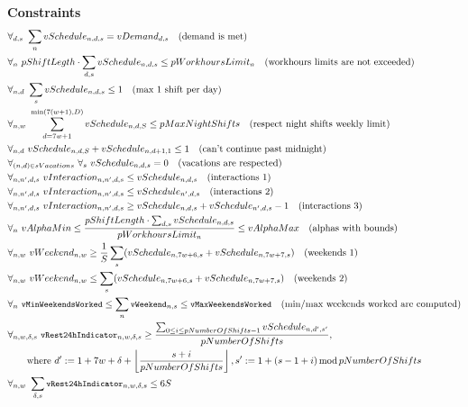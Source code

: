 \documentclass{article}
\newcommand{\varWeekendWorkedIndicator}[2]{\texttt{\small vWeekend}_{#1, #2}}
\newcommand{\varMinWeekendsWorked}{\texttt{\small vMinWeekendsWorked}}
\newcommand{\varMaxWeekendsWorked}{\texttt{\small vMaxWeekendsWorked}}
\newcommand{\varDayLengthBreakIndicator}[4]{\texttt{\small vRest24hIndicator}_{#1, #2, #3, #4}}
\begin{document}
\textbf{Constraints}
\begin{align*}
&\forall_{d,s}\ \sum_n vSchedule_{n,d,s} = vDemand_{d, s}\quad \text{(demand is met)} \\
&\forall_{n}\ pShiftLegth\cdot\sum_{d, s} vSchedule_{n,d,s} \leq pWorkhoursLimit_n \quad \text{(workhours limits are not exceeded)} \\
&\forall_{n,d}\ \sum_s vSchedule_{n,d,s} \leq 1\quad \text{(max 1 shift per day)} \\
&\forall_{n,w}\ \sum_{d=7w+1}^{\min(7(w+1), D)} vSchedule_{n,d,S} \leq pMaxNightShifts \quad \text{(respect night shifts weekly limit)} \\
&\forall_{n,d}\ vSchedule_{n,d,S}+vSchedule_{n,d+1,1} \leq 1\quad \text{(can't continue past midnight)} \\
&\forall_{(n,d)\in sVacations}\ \forall_s\ vSchedule_{n,d,s} = 0\quad \text{(vacations are respected)} \\
&\forall_{n,n',d,s}\ vInteraction_{n,n',d,s} \leq vSchedule_{n,d,s}\quad \text{(interactions 1)} \\
&\forall_{n,n',d,s}\ vInteraction_{n,n',d,s} \leq vSchedule_{n',d,s}\quad \text{(interactions 2)} \\
&\forall_{n,n',d,s}\ vInteraction_{n,n',d,s} \geq vSchedule_{n,d,s}+vSchedule_{n',d,s}-1\quad \text{(interactions 3)} \\
&\forall_{n}\ vAlphaMin \leq \frac{pShiftLength\cdot\sum_{d,s}vSchedule_{n,d,s}}{pWorkhoursLimit_n} \leq vAlphaMax\quad \text{(alphas with bounds)} \\
&\forall_{n, w}\ vWeekend_{n, w} \geq \frac{1}{S}\sum_s (vSchedule_{n, 7w+6, s} + vSchedule_{n, 7w+7, s}) \quad \text{(weekends 1)} \\
&\forall_{n, w}\ vWeekend_{n, w} \leq \sum_s (vSchedule_{n, 7w+6, s} + vSchedule_{n, 7w+7, s}) \quad \text{(weekends 2)} \\
&\forall_{n}\ \varMinWeekendsWorked \le \sum_n \varWeekendWorkedIndicator{n}{s} \le \varMaxWeekendsWorked \quad \text{(min/max weekends worked are computed)} \\
&\forall_{n,w,\delta,s}\ \varDayLengthBreakIndicator{n}{w}{\delta}{s} \ge \frac{\sum_{0 \le i \le pNumberOfShifts - 1} vSchedule_{n, d', s'}}{pNumberOfShifts}, \\
    &\qquad\text{where } d' := 1+7w+\delta+\left\lfloor\frac{s+i}{pNumberOfShifts}\right\rfloor, s' := 1 + (s - 1 + i) \operatorname{mod} pNumberOfShifts \\
&\forall_{n, w}\ \sum_{\delta, s} \varDayLengthBreakIndicator{n}{w}{\delta}{s} \le 6S
\end{align*}
\end{document}
